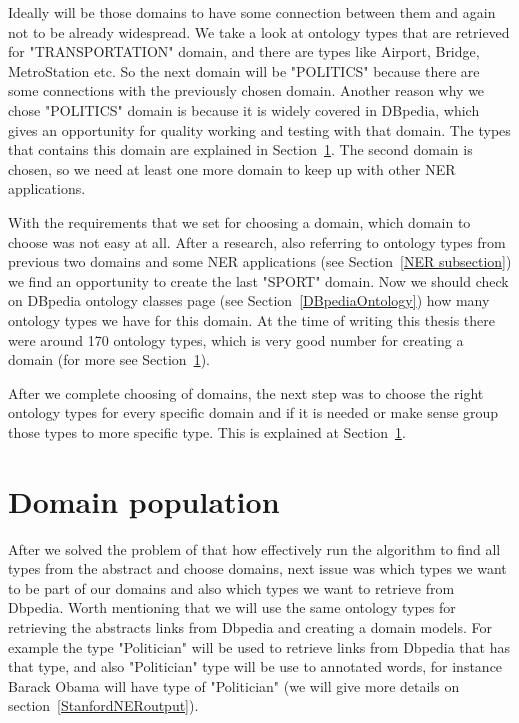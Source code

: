 \documentclass[thesis=M,english]{FITthesis}[2018/05/30]
\begin{document}
	Ideally will be those domains to have some connection between them and again not to be already widespread. We take a look at ontology types that are retrieved for "TRANSPORTATION" domain, and there are types like Airport, Bridge, MetroStation etc. So the next domain will be "POLITICS" because there are some connections with the previously chosen domain. Another reason why we chose "POLITICS" domain is because it is widely covered in DBpedia, which gives an opportunity for quality working and testing with that domain. The types that contains this domain are explained in Section~\ref{typesRetrieval}. The second domain is chosen, so we need at least one more domain to keep up with other NER applications.
	
	
	
	With the requirements that we set for choosing a domain, which domain to choose was not easy at all. After a research, also referring to ontology types from previous two domains and some NER applications (see Section~\ref{NER subsection}) we find an opportunity to create the last "SPORT" domain. Now we should check on DBpedia ontology classes page (see Section~\ref{DBpediaOntology}) how many ontology types we have for this domain. At the time of writing this thesis there were around 170 ontology types, which is very good number for creating a domain (for more see Section~\ref{typesRetrieval}).
	
After we complete choosing of domains, the next step was to choose the right ontology types for every specific domain and if it is needed or make sense group those types to more specific type. This is explained at Section~\ref{typesRetrieval}. 

\section{Domain population}\label{typesRetrieval}
	After we solved the problem of that how effectively run the algorithm to find all types from the abstract and choose domains, next issue was which types we want to be part of our domains and also which types we want to retrieve from Dbpedia. Worth mentioning that we will use the same ontology types for retrieving the abstracts links from Dbpedia and creating a domain models. For example the type "Politician" will be used to retrieve links from Dbpedia that has that type, and also "Politician" type will be use to annotated words, for instance Barack Obama will have type of "Politician" (we will give more details on section~\ref{StanfordNERoutput}).
\end{document}
